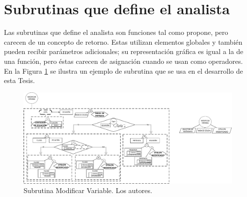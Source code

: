 
\section{Subrutinas que define el analista}\label{sec:PS_ADS}
Las subrutinas que define el analista son funciones tal como \cite{JCalle} propone, pero carecen de un concepto de retorno. Estas utilizan elementos globales y también pueden recibir parámetros adicionales; su representación gráfica es igual a la de una función, pero éstas carecen de asignación cuando se usan como operadores. En la Figura \ref{fig:Subroutine} se ilustra un ejemplo de subrutina que se usa en el desarrollo de esta Tesis. %

\begin{figure}[h]
	\centering%
	\includegraphics[width=\linewidth]{Fig/SubrutinaEjemplo.pdf}%
	\caption[Subrutina Modificar Variable.]{Subrutina Modificar Variable. Los autores.} \label{fig:Subroutine}
\end{figure}

